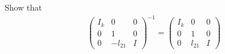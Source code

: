 \documentclass[11pt,a4paper]{article}
\begin{document}
\begin{titlepage}
    \maketitle
\end{titlepage}
\begin{center} 
    \tableofcontents  
%
\end{center}
\newpage
\setcounter{section}{5}
\section{}
Show that 
\begin{align}
    \left( \begin{array}{c|c|c} 
            I_k & 0 & 0 \\ \hline 0 & 1 & 0 \\ \hline 0 & -l_{21} & I
        \end{array} \right)^{-1}
    =
    \left( \begin{array}{c|c|c} 
            I_k & 0 & 0 \\ \hline 0 & 1 & 0 \\ \hline 0 & l_{21} & I
        \end{array} \right)
\end{align}
\end{document}
